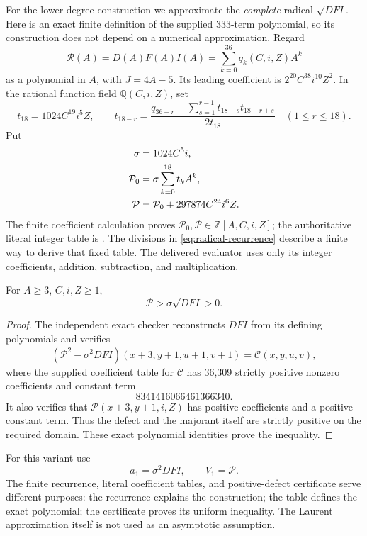 For the lower-degree construction we approximate the \emph{complete}
radical \(\sqrt{DFI}\). Here is an exact finite definition of the supplied
333-term polynomial, so its construction does not depend on a numerical
approximation. Regard
\[
 \mathcal R(A)=D(A)F(A)I(A)=\sum_{k=0}^{36}q_k(C,i,Z)A^k
\]
as a polynomial in \(A\), with \(J=4A-5\).
Its leading coefficient is \(2^{20}C^{38}i^{10}Z^2\). In the rational
function field \(\mathbb Q(C,i,Z)\), set
\begin{equation}
 t_{18}=1024C^{19}i^5Z,\qquad
 t_{18-r}=
 \frac{q_{36-r}-\sum_{s=1}^{r-1}t_{18-s}t_{18-r+s}}{2t_{18}}
 \quad(1\le r\le18).
 \label{eq:radical-recurrence}
\end{equation}
Put
\begin{align}
 \sigma&=1024C^5i,\notag\\
 \mathcal P_0&=\sigma\sum_{k=0}^{18}t_k A^k,\notag\\
 \mathcal P&=\mathcal P_0+297874C^{24}i^6Z.
 \label{eq:complete-majorant}
\end{align}
The finite coefficient calculation proves
\(\mathcal P_0,\mathcal P\in\mathbb Z[A,C,i,Z]\); the authoritative literal
integer table is
\texttt{}.
The divisions in \eqref{eq:radical-recurrence} describe a finite way to
derive that fixed table. The delivered evaluator uses only its integer
coefficients, addition, subtraction, and multiplication.

\begin{proposition}
\label{prop:complete-majorant}
For \(A\ge3\), \(C,i,Z\ge1\),
\[
 \mathcal P>\sigma\sqrt{DFI}>0.
\]
\end{proposition}
\begin{proof}
The independent exact checker reconstructs \(DFI\) from its defining
polynomials and verifies
\[
 \left(\mathcal P^2-\sigma^2DFI\right)
 (x+3,y+1,u+1,v+1)=\mathcal C(x,y,u,v),
\]
where the supplied coefficient table for \(\mathcal C\) has 36,309
strictly positive nonzero coefficients and constant term
\[
 8341416066461366340.
 \label{eq:defect-positive-constant}
\]
It also verifies that \(\mathcal P(x+3,y+1,i,Z)\) has positive
coefficients and a positive constant term. Thus the defect and the
majorant itself are strictly positive on the required domain. These exact
polynomial identities prove the inequality.
\end{proof}

For this variant use
\begin{equation}
 a_1=\sigma^2DFI,\qquad V_1=\mathcal P.
 \label{eq:complete-variant}
\end{equation}
The finite recurrence, literal coefficient tables, and positive-defect
certificate serve different purposes: the recurrence explains the
construction; the table defines the exact polynomial; the certificate
proves its uniform inequality. The Laurent approximation itself is not
used as an asymptotic assumption.

